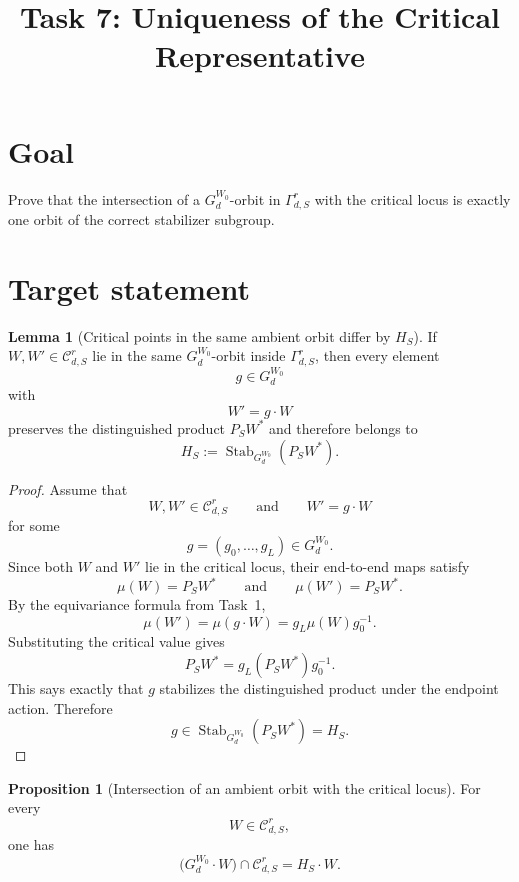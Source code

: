 \documentclass{article}
\title{Task 7: Uniqueness of the Critical Representative}
\date{}
\newcommand{\Stab}{\operatorname{Stab}}
\theoremstyle{definition}
\newtheorem{proposition}[theorem]{Proposition}
\newtheorem{lemma}[theorem]{Lemma}
\begin{document}
\maketitle

\section{Goal}

Prove that the intersection of a $G_d^{W_0}$-orbit in $\Gamma_{d,S}^r$ with the critical locus is exactly one orbit of the correct stabilizer subgroup.

\section{Target statement}

\begin{lemma}[Critical points in the same ambient orbit differ by $H_S$]\label{lem:ambient-orbit-implies-HS}
If $W,W'\in \mathcal C_{d,S}^r$ lie in the same $G_d^{W_0}$-orbit inside
$\Gamma_{d,S}^r$, then every element
\[
g\in G_d^{W_0}
\]
with
\[
W'=g\cdot W
\]
preserves the distinguished product $P_SW^\ast$ and therefore belongs to
\[
H_S:=\Stab_{G_d^{W_0}}(P_SW^\ast).
\]
\end{lemma}

\begin{proof}
Assume that
\[
W,W'\in \mathcal C_{d,S}^r
\qquad\text{and}\qquad
W'=g\cdot W
\]
for some
\[
g=(g_0,\dots,g_L)\in G_d^{W_0}.
\]
Since both $W$ and $W'$ lie in the critical locus, their end-to-end maps satisfy
\[
\mu(W)=P_SW^\ast
\qquad\text{and}\qquad
\mu(W')=P_SW^\ast.
\]
By the equivariance formula from Task~1,
\[
\mu(W')=\mu(g\cdot W)=g_L\mu(W)g_0^{-1}.
\]
Substituting the critical value gives
\[
P_SW^\ast=g_L(P_SW^\ast)g_0^{-1}.
\]
This says exactly that $g$ stabilizes the distinguished product under the
endpoint action. Therefore
\[
g\in \Stab_{G_d^{W_0}}(P_SW^\ast)=H_S.
\]
\end{proof}

\begin{proposition}[Intersection of an ambient orbit with the critical locus]\label{prop:orbit-intersection}
For every
\[
W\in \mathcal C_{d,S}^r,
\]
one has
\[
\bigl(G_d^{W_0}\cdot W\bigr)\cap \mathcal C_{d,S}^r
=
H_S\cdot W.
\]
\end{proposition}
\end{document}
